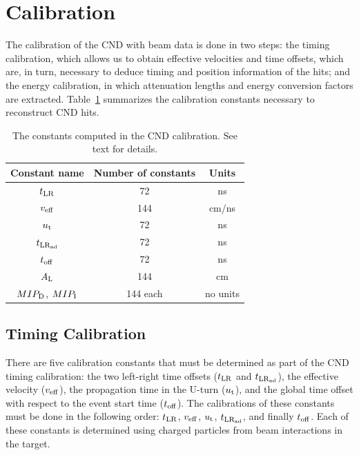 \section{Calibration}\label{sec_cnd_calib}

The calibration of the CND with beam data is done in two steps: the timing calibration, which allows us to obtain effective velocities and time offsets, which are, in turn, necessary to deduce timing and position information of the hits; and the energy calibration, in which attenuation lengths and energy conversion factors are extracted.
Table~\ref{table_cnd_constants} summarizes the calibration constants necessary to reconstruct CND hits.

\begin{table}
\begin{tabular}{|c|c|c|}
\hline
Constant name & Number of constants  & Units \\
\hline
$t_{\rm{LR}}$ & 72 & ns\\
\hline
$v_{\rm{eff}}$ & 144 & cm/ns \\
\hline
$u_{\rm{t}}$ & 72 & ns \\
\hline
$t_{\rm{LR}_{\rm{ad}}}$ & 72 & ns \\
\hline
$t_{\rm{off}}$ &72 & ns\\
\hline
$A_{\rm{L}}$ & 144 & cm\\
\hline
$MIP_{\rm{D}}$, $MIP_{\rm{I}}$ & 144 each & no units \\
\hline
\end{tabular}
\caption{The constants computed in the CND calibration. See text for details.}
\label{table_cnd_constants}
\end{table}

\subsection{Timing Calibration}
\label{sec_timing_calib}

There are five calibration constants that must be determined as part of the CND timing calibration: the two left-right time offsets ($t_{\rm{LR}}$ and  $t_{\rm{LR}_{\rm{ad}}}$), the effective velocity ($v_{\rm{eff}}$), the propagation time in the U-turn ($u_{\rm{t}}$), and the global time offset with respect to the event start time ($t_{\rm{off}}$). The calibrations of these constants must be done in the following order: $t_{\rm{LR}}$, $v_{\rm{eff}}$, $u_{\rm{t}}$,  $t_{\rm{LR}_{\rm{ad}}}$, and finally $t_{\rm{off}}$. 
Each of these constants is determined using charged particles from beam interactions in the target.

